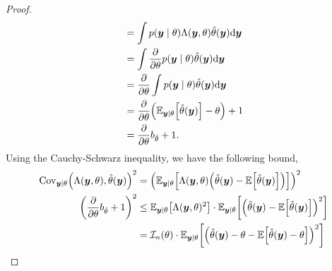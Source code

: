 \begin{proof}
\begin{align*}
                                                                                                   & = \int p(\vec{y}\mid\theta) \Lambda(\vec{y}, \theta) \hat{\theta}(\vec{y}) \mathrm{d}\vec{y}                                                                                                      \\
                                                                                                   & = \int \pdv*{p(\vec{y} \mid \theta)}{\theta} \hat{\theta}(\vec{y}) \mathrm{d}\vec{y}                                                                                                              \\
                                                                                                   & = \pdv*{\int p(\vec{y} \mid \theta) \hat{\theta}(\vec{y}) \mathrm{d}\vec{y}}{\theta}                                                                                                              \\
                                                                                                   & = \pdv*{\lft( \E_{\vec{y}\mid \theta}\lft[\hat{\theta}(\vec{y})\rgt] - \theta \rgt)}{\theta} + 1                                                                                                  \\
                                                                                                   & = \pdv*{b_{\hat{\theta}}}{\theta} + 1.
    \end{align*}
    Using the Cauchy-Schwarz inequality, we have the following bound,
    \begin{align*}
        \mathrm{Cov}_{\vec{y}\mid \theta} \lft( \Lambda(\vec{y}, \theta), \hat{\theta}(\vec{y}) \rgt)^2 & = \lft( \E_{\vec{y}\mid \theta} \lft[ \Lambda(\vec{y},\theta) \lft( \hat{\theta}(\vec{y}) - \E \lft[ \hat{\theta}(\vec{y}) \rgt] \rgt) \rgt] \rgt)^2                                           \\
        \lft( \pdv*{b_{\hat{\theta}}}{\theta} + 1 \rgt)^2                                               & \leq \E_{\vec{y}\mid \theta}\lft[ \Lambda(\vec{y},\theta)^2 \rgt] \cdot \E_{\vec{y} \mid \theta} \lft[ \lft( \hat{\theta}(\vec{y}) - \E \lft[ \hat{\theta}(\vec{y}) \rgt] \rgt)^2 \rgt]        \\
                                                                                                        & = \mathcal{I}_n(\theta) \cdot \E_{\vec{y} \mid \theta} \lft[ \lft( \hat{\theta}(\vec{y}) - \theta - \E \lft[ \hat{\theta}(\vec{y}) - \theta \rgt] \rgt)^2 \rgt]                                \\

\end{align*}
\end{proof}
